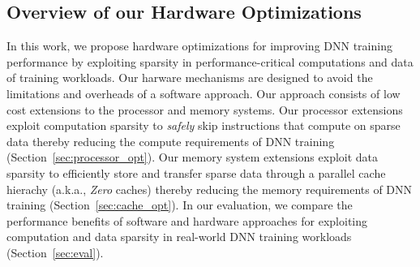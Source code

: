 \subsection{Overview of our Hardware Optimizations}
\label{subsec:overview}
In this work, we propose hardware optimizations for improving DNN training performance by exploiting sparsity in performance-critical computations and data of training workloads. Our harware mechanisms are designed to avoid the limitations and overheads of a software approach.   Our approach consists of low cost extensions to the processor and memory systems.  Our processor extensions exploit computation sparsity to \emph{safely} skip instructions that compute on sparse data thereby reducing the compute requirements of  DNN training (Section~\ref{sec:processor_opt}).   Our memory system extensions  exploit data sparsity to efficiently store and transfer sparse data through a parallel cache hierachy (a.k.a., {\it Zero} caches) thereby reducing the memory requirements of DNN training (Section~\ref{sec:cache_opt}).  In our evaluation, we compare the performance benefits of software and hardware approaches for exploiting computation and data sparsity in real-world DNN training workloads (Section~\ref{sec:eval}). 

 
